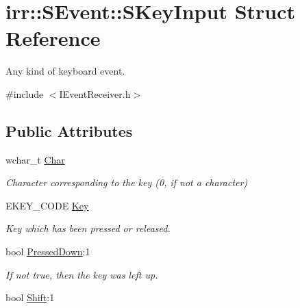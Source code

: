 \hypertarget{structirr_1_1SEvent_1_1SKeyInput}{}\section{irr\+:\+:S\+Event\+:\+:S\+Key\+Input Struct Reference}
\label{structirr_1_1SEvent_1_1SKeyInput}


Any kind of keyboard event.  




{\ttfamily \#include $<$I\+Event\+Receiver.\+h$>$}

\subsection*{Public Attributes}
\begin{DoxyCompactItemize}
\item 
wchar\+\_\+t \hyperlink{structirr_1_1SEvent_1_1SKeyInput_a06ea804f1348b79e0fa175606ab5a479}{Char}\hypertarget{structirr_1_1SEvent_1_1SKeyInput_a06ea804f1348b79e0fa175606ab5a479}{}\label{structirr_1_1SEvent_1_1SKeyInput_a06ea804f1348b79e0fa175606ab5a479}

\begin{DoxyCompactList}\small\item\em Character corresponding to the key (0, if not a character) \end{DoxyCompactList}\item 
E\+K\+E\+Y\+\_\+\+C\+O\+DE \hyperlink{structirr_1_1SEvent_1_1SKeyInput_a9cb585618a70c835613fec5b5806cb06}{Key}\hypertarget{structirr_1_1SEvent_1_1SKeyInput_a9cb585618a70c835613fec5b5806cb06}{}\label{structirr_1_1SEvent_1_1SKeyInput_a9cb585618a70c835613fec5b5806cb06}

\begin{DoxyCompactList}\small\item\em Key which has been pressed or released. \end{DoxyCompactList}\item 
bool \hyperlink{structirr_1_1SEvent_1_1SKeyInput_a9cf0a2a7ba9f2d14de79c420c7ba55d9}{Pressed\+Down}\+:1\hypertarget{structirr_1_1SEvent_1_1SKeyInput_a9cf0a2a7ba9f2d14de79c420c7ba55d9}{}\label{structirr_1_1SEvent_1_1SKeyInput_a9cf0a2a7ba9f2d14de79c420c7ba55d9}

\begin{DoxyCompactList}\small\item\em If not true, then the key was left up. \end{DoxyCompactList}\item 
bool \hyperlink{structirr_1_1SEvent_1_1SKeyInput_a54b1c282890d6f6da7ba2f73d795d45a}{Shift}\+:1\hypertarget{structirr_1_1SEvent_1_1SKeyInput_a54b1c282890d6f6da7ba2f73d795d45a}{}\label{structirr_1_1SEvent_1_1SKeyInput_a54b1c282890d6f6da7ba2f73d795d45a}


\end{DoxyCompactItemize}
